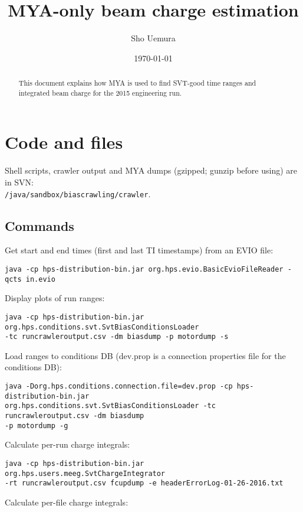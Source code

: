 \documentclass[aps,amsmath,amssymb,notitlepage,10pt,onecolumn]{revtex4-1}
\begin{document}

\title{MYA-only beam charge estimation}
\author{Sho Uemura}
\date{\today}
\begin{abstract}
    This document explains how MYA is used to find SVT-good time ranges and integrated beam charge for the 2015 engineering run.
\end{abstract}
\maketitle

\section{Code and files}

Shell scripts, crawler output and MYA dumps (gzipped; gunzip before using) are in SVN:\\ \texttt{/java/sandbox/biascrawling/crawler}.

\subsection{Commands}
Get start and end times (first and last TI timestamps) from an EVIO file:

\texttt{java -cp hps-distribution-bin.jar org.hps.evio.BasicEvioFileReader -qcts in.evio}

Display plots of run ranges:

\texttt{java -cp hps-distribution-bin.jar org.hps.conditions.svt.SvtBiasConditionsLoader\\ -tc runcrawleroutput.csv -dm biasdump -p motordump -s}

Load ranges to conditions DB (dev.prop is a connection properties file for the conditions DB):

\texttt{java -Dorg.hps.conditions.connection.file=dev.prop -cp hps-distribution-bin.jar\\ org.hps.conditions.svt.SvtBiasConditionsLoader -tc runcrawleroutput.csv -dm biasdump\\ -p motordump -g}

Calculate per-run charge integrals:

\texttt{java -cp hps-distribution-bin.jar org.hps.users.meeg.SvtChargeIntegrator\\ -rt runcrawleroutput.csv fcupdump -e headerErrorLog-01-26-2016.txt}

Calculate per-file charge integrals:
\end{document}
